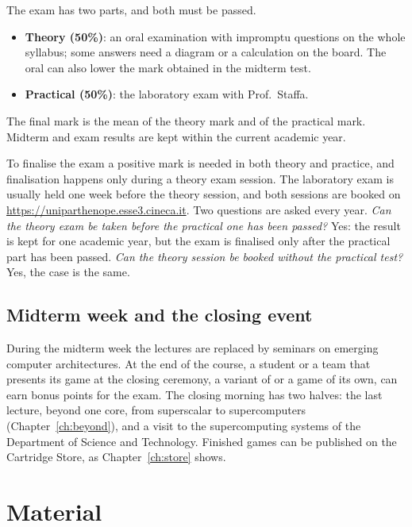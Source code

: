 The exam has two parts, and both must be passed.

\begin{itemize}
\item \textbf{Theory (50\%)}: an oral examination with impromptu questions on
  the whole syllabus; some answers need a diagram or a calculation on the
  board. The oral can also lower the mark obtained in the midterm test.
\item \textbf{Practical (50\%)}: the laboratory exam with Prof.\ Staffa.
\end{itemize}

The final mark is the mean of the theory mark and of the practical mark.
Midterm and exam results are kept within the current academic year.

To finalise the exam a positive mark is needed in both theory and practice,
and finalisation happens only during a theory exam session. The laboratory
exam is usually held one week before the theory session, and both sessions are
booked on \url{https://uniparthenope.esse3.cineca.it}. Two questions are asked
every year. \emph{Can the theory exam be taken before the practical one has
been passed?} Yes: the result is kept for one academic year, but the exam is
finalised only after the practical part has been passed. \emph{Can the theory
session be booked without the practical test?} Yes, the case is the same.

\subsection{Midterm week and the closing event}

During the midterm week the lectures are replaced by seminars on emerging
computer architectures. At the end of the course, a student or a team that
presents its game at the closing ceremony, a variant of \vermone or a game of
its own, can earn bonus points for the exam. The closing morning has two
halves: the last lecture, beyond one core, from superscalar \riscv to
supercomputers (Chapter~\ref{ch:beyond}), and a visit to the supercomputing
systems of the Department of Science and Technology. Finished games can be
published on the \prg Cartridge Store, as Chapter~\ref{ch:store} shows.

\section{Material}


